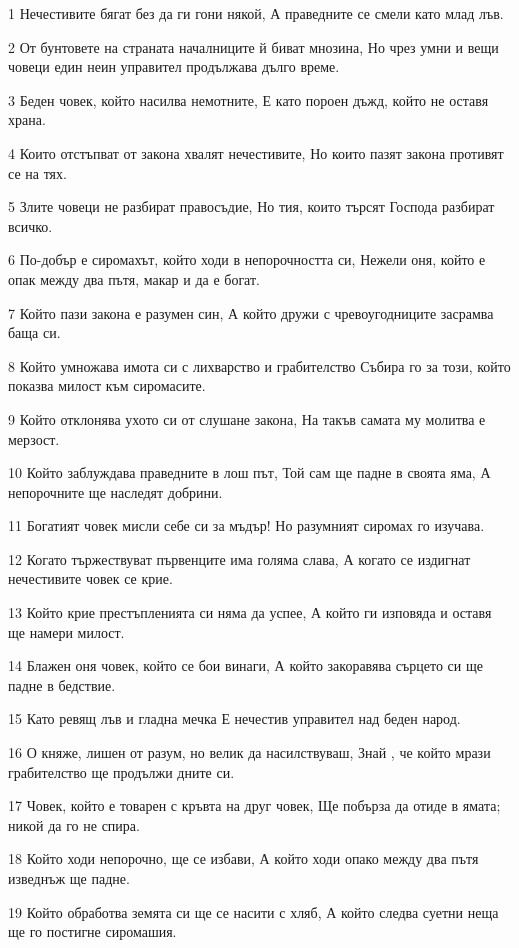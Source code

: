 \par 1 Нечестивите бягат без да ги гони някой, А праведните се смели като млад лъв.
\par 2 От бунтовете на страната началниците й биват мнозина, Но чрез умни и вещи човеци един неин управител продължава дълго време.
\par 3 Беден човек, който насилва немотните, Е като пороен дъжд, който не оставя храна.
\par 4 Които отстъпват от закона хвалят нечестивите, Но които пазят закона противят се на тях.
\par 5 Злите човеци не разбират правосъдие, Но тия, които търсят Господа разбират всичко.
\par 6 По-добър е сиромахът, който ходи в непорочността си, Нежели оня, който е опак между два пътя, макар и да е богат.
\par 7 Който пази закона е разумен син, А който дружи с чревоугодниците засрамва баща си.
\par 8 Който умножава имота си с лихварство и грабителство Събира го за този, който показва милост към сиромасите.
\par 9 Който отклонява ухото си от слушане закона, На такъв самата му молитва е мерзост.
\par 10 Който заблуждава праведните в лош път, Той сам ще падне в своята яма, А непорочните ще наследят добрини.
\par 11 Богатият човек мисли себе си за мъдър! Но разумният сиромах го изучава.
\par 12 Когато тържествуват първенците има голяма слава, А когато се издигнат нечестивите човек се крие.
\par 13 Който крие престъпленията си няма да успее, А който ги изповяда и оставя ще намери милост.
\par 14 Блажен оня човек, който се бои винаги, А който закоравява сърцето си ще падне в бедствие.
\par 15 Като ревящ лъв и гладна мечка Е нечестив управител над беден народ.
\par 16 О княже, лишен от разум, но велик да насилствуваш, Знай , че който мрази грабителство ще продължи дните си.
\par 17 Човек, който е товарен с кръвта на друг човек, Ще побърза да отиде в ямата; никой да го не спира.
\par 18 Който ходи непорочно, ще се избави, А който ходи опако между два пътя изведнъж ще падне.
\par 19 Който обработва земята си ще се насити с хляб, А който следва суетни неща ще го постигне сиромашия.
